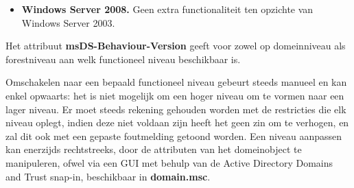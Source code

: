 \begin{enumerate}
{\begin{itemize}
\begin{itemize}
\begin{itemize}
						\item Dynamische objecten, met een beperkte levensduur.
						\item Efficiënte replicatie van de global catalog gegevens.
						\item Het veranderen van de naamgeving en de hiërarchische structuur van domeinen in een forest.
						\item Transitieve vertrouwensrelaties tussen verschillende forests.
						\item Read-only Windows Server 2008+ domeincontrollers.
						\item Efficiëntere KCC algoritmen om de replicatietechnologie te herconstrueren.
						\item Replicatie van de individuele waarden van multi-valued attributen.				
					\end{itemize}
					\item \textbf{Windows Server 2008.} Geen extra functionaliteit ten opzichte van Windows Server 2003.
				\end{itemize}
			\end{itemize}	
		}
		
		 { 
			 Het attribuut \textbf{msDS-Behaviour-Version} geeft voor zowel op domeinniveau als forestniveau aan welk functioneel niveau beschikbaar is.
		}
		
		 {
			 Omschakelen naar een bepaald functioneel niveau gebeurt steeds manueel en kan enkel opwaarts: het is niet mogelijk om een hoger niveau om te vormen naar een lager niveau. Er moet steeds rekening gehouden worden met de restricties die elk niveau oplegt, indien deze niet voldaan zijn heeft het geen zin om te verhogen, en zal dit ook met een gepaste foutmelding getoond worden. Een niveau aanpassen kan enerzijds rechtstreeks, door de attributen van het domeinobject te manipuleren, ofwel via een GUI met behulp van de Active Directory Domains and Trust snap-in, beschikbaar in \textbf{domain.msc}.  
				
				
		}

	\end{enumerate}
	
